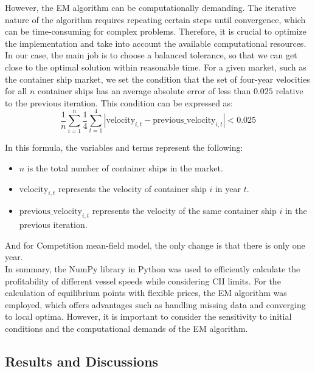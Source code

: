 \documentclass[a4paper,12pt]{article}
\begin{document}
However, the EM algorithm can be computationally demanding.
The iterative nature of the algorithm requires repeating certain steps until convergence, which can be time-consuming for complex problems.
Therefore, it is crucial to optimize the implementation and take into account the available computational resources.
In our case, the main job is to choose a balanced tolerance, so that we can get close to the optimal solution within reasonable time.
For a given market, such as the container ship market, we set the condition that the set of four-year velocities for all $n$ container ships has an average absolute error of less than $0.025$ relative to the previous iteration.
This condition can be expressed as:
\begin{equation}
	\frac{1}{n}\sum_{i=1}^{n} \frac{1}{4} \sum_{t=1}^{4} \left| \text{velocity}_{i,t} - \text{previous\_velocity}_{i,t} \right| < 0.025
\end{equation}

In this formula, the variables and terms represent the following:
\begin{itemize}
	\item $n$ is the total number of container ships in the market.
	\item $\text{velocity}_{i,t}$ represents the velocity of container ship $i$ in year $t$.
	\item $\text{previous\_velocity}_{i,t}$ represents the velocity of the same container ship $i$ in the previous iteration.
\end{itemize}

And for Competition mean-field model, the only change is that there is only one year.\\

In summary, the NumPy library in Python was used to efficiently calculate the profitability of different vessel speeds while considering CII limits.
For the calculation of equilibrium points with flexible prices, the EM algorithm was employed, which offers advantages such as handling missing data and converging to local optima.
However, it is important to consider the sensitivity to initial conditions and the computational demands of the EM algorithm.\\







\subsection{Results and Discussions}
\end{document}
